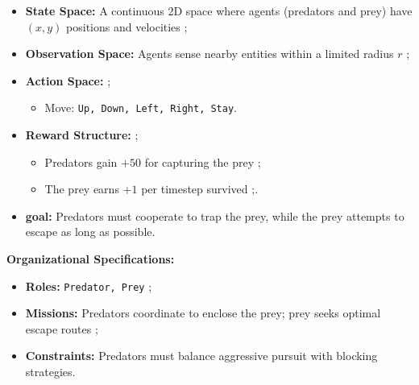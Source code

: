 \documentclass[pdflatex,sn-mathphys-num]{sn-jnl}%
\theoremstyle{thmstyleone}%
\theoremstyle{thmstyletwo}%
\theoremstyle{thmstylethree}%
\begin{document}
\begin{itemize}
    \item \textbf{State Space:} A continuous 2D space where agents (predators and prey) have $(x, y)$ positions and velocities ;
    \item \textbf{Observation Space:} Agents sense nearby entities within a limited radius $r$ ;
    \item \textbf{Action Space:}  ;
          \begin{itemize}
              \item Move: \texttt{Up, Down, Left, Right, Stay}.
          \end{itemize}
    \item \textbf{Reward Structure:} ;
          \begin{itemize}
              \item Predators gain $+50$ for capturing the prey ;
              \item The prey earns $+1$ per timestep survived ;.
          \end{itemize}
    \item \textbf{goal:} Predators must cooperate to trap the prey, while the prey attempts to escape as long as possible.
\end{itemize}

\textbf{Organizational Specifications:}
\begin{itemize}
    \item \textbf{Roles:} \texttt{Predator, Prey} ;
    \item \textbf{Missions:} Predators coordinate to enclose the prey; prey seeks optimal escape routes ;
    \item \textbf{Constraints:} Predators must balance aggressive pursuit with blocking strategies.
\end{itemize}
\end{document}
